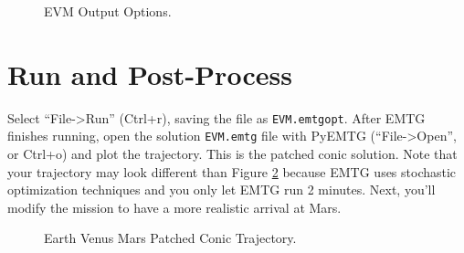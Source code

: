 \documentclass[11pt]{article}
\begin{document}
\begin{figure}[H]
	\centering
	\caption{\label{fig:output_options}EVM Output Options.}
\end{figure}

\section{Run and Post-Process}
\label{sec:run_and_post_process}

Select ``File-\textgreater Run'' (Ctrl+r), saving the file as \texttt{EVM.emtgopt}. After \ac{EMTG} finishes running, open the solution \texttt{EVM.emtg} file with PyEMTG (``File-\textgreater Open'', or Ctrl+o) and plot the trajectory. This is the patched conic solution. Note that your trajectory may look different than Figure \ref{fig:patched_conic_traj} because \ac{EMTG} uses stochastic optimization techniques and you only let \ac{EMTG} run 2 minutes. Next, you’ll modify the mission to have a more realistic arrival at Mars.

\begin{figure}[H]
	\centering
	\caption{\label{fig:patched_conic_traj}Earth Venus Mars Patched Conic Trajectory.}
\end{figure}
\end{document}
